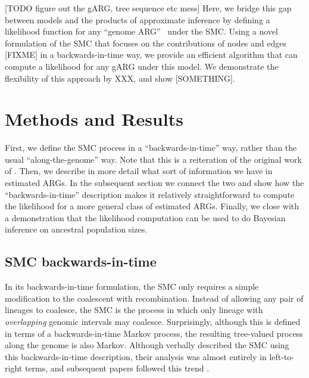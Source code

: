 \documentclass{article}
\begin{document}
[TODO figure out the gARG, tree sequence etc mess]
Here, we bridge this gap between models and the products of approximate
inference by defining a likelihood function for any 
``genome ARG''~\citep{wong_general_2023} under the SMC. Using a novel
formulation of the SMC that focuses on the contributions of nodes and 
edges [FIXME] in a backwards-in-time way, we provide an efficient 
algorithm that can compute a likelihood for any gARG under this model.
We demonstrate the flexibility of this approach by XXX, and show
[SOMETHING]. 


\section{Methods and Results}

First, we define the SMC process in a ``backwards-in-time'' way,
rather than the usual ``along-the-genome'' way.
Note that this is a
reiteration of the original work of \citet{mcvean_approximating_2005}.
Then, we describe
in more detail what sort of information we have in estimated ARGs.
In the subsequent section we connect the two and
show how the ``backwards-in-time'' description
makes it relatively straightforward to compute the likelihood
for a more general class of estimated ARGs.
Finally, we close with a demonstration that the likelihood computation can be used
to do Bayesian inference on ancestral population sizes.

\subsection{SMC backwards-in-time}\label{par:description}

In its backwards-in-time formulation, the SMC \citep{mcvean_approximating_2005} only requires a
simple modification to the coalescent with recombination.
Instead of allowing any pair of lineages to coalesce,
the SMC is the process in which only lineage with \emph{overlapping} genomic intervals may coalesce.
Surprisingly, although this is defined in terms of a backwards-in-time Markov process,
the resulting tree-valued process along the genome is also Markov.
Although \citet{mcvean_approximating_2005} verbally described the SMC 
using this backwards-in-time description, their analysis
was almost entirely in left-to-right terms,
and subsequent papers followed this trend 
\citep{li_inference_2011,paul_accurate_2011,schiffels_inferring_2014,rasmussen_genome-wide_2014}.
\end{document}
